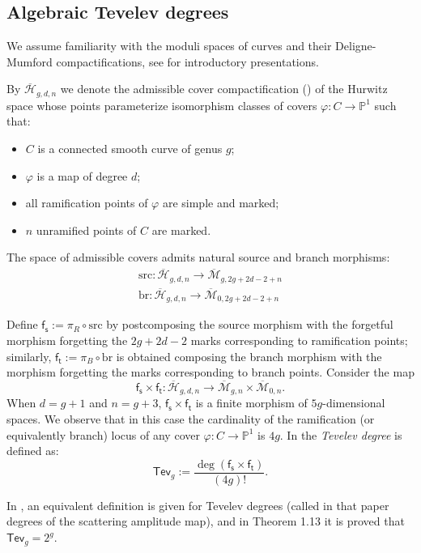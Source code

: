 \documentclass[11pt,reqno]{amsart}
\theoremstyle{definition}
\newcommand{\bP}{\mathds{P}}
\newcommand{\calM}{\mathcal{M}}
\newcommand{\Mbar}{\overline{\calM}}
\newcommand\Mgnbar[1]{\Mbar_{#1}}
\newcommand\Adm[1]{ \mathcal{ \overline{H}}_{#1}}
\newcommand\br{\mathrm{br}}
\newcommand\src{\mathrm{src}}
\newcommand{\ft}{\mathsf{f_t}}
\newcommand{\fs}{\mathsf{f_s}}
\newcommand{\Tev}{{\mathsf{Tev}}}
\begin{document}
\subsection{Algebraic Tevelev degrees}\label{sec:aac}
We assume familiarity with the moduli spaces of curves and their Deligne-Mumford compactifications, see \cite{KV:IQC, HM:moc} for  introductory presentations.

By $\Adm{g,d,n}$ we denote the admissible cover compactification (\cite{HM:ac}) of the Hurwitz space whose points parameterize isomorphism classes of covers $\varphi:C\to \bP^1$ such that:
\begin{itemize}
    \item $C$ is a connected smooth curve of genus $g$;
    \item $\varphi$ is a map of degree $d$;
    \item all ramification points of $\varphi$ are simple and marked;
    \item $n$ unramified points of $C$ are marked.
\end{itemize}
The space of admissible covers admits natural source and branch morphisms:
\begin{align}
    \src: \Adm{g,d,n} \to \Mgnbar{g,2g+2d-2+n} \nonumber\\
    \br: \Adm{g,d,n} \to \Mgnbar{0,2g+2d-2+n}
\end{align}

 Define $\fs:= \pi_R\circ \src$ by postcomposing the source morphism with the forgetful morphism forgetting the $2g+2d-2$ marks corresponding to ramification points; similarly, $\ft:= \pi_B\circ \br$  is obtained composing the branch morphism with the morphism forgetting the marks corresponding to branch points.
Consider the map
\begin{equation}
    \label{eq:forgfinitemap}
    \fs\times\ft: \Adm{g,d,n} \to \Mgnbar{g,n} \times \Mgnbar{0,n}.
\end{equation}
When $d = g+1$ and $n = g+3$, $\fs\times\ft$ is a finite morphism of $5g$-dimensional spaces. We observe that in this case the cardinality of the ramification (or equivalently branch) locus of any cover $\varphi:C\to \bP^1$ is $4g$. In \cite[Section 1.2]{CPS:Tevdeg} the {\it Tevelev degree} is defined as:
\begin{equation}
    \label{def:algTev}
    \Tev_g:= \frac{\deg (\fs\times\ft)}{(4g)!}.
\end{equation}

In \cite{Tevelev:2020zux}, an equivalent definition is given for Tevelev degrees (called in that paper degrees of the scattering amplitude map), and in Theorem 1.13 it is proved that $\Tev_g = 2^g$.
\end{document}
